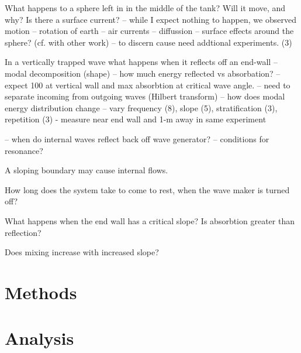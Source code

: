 \documentclass[11pt,letterpaper]{article}
\begin{document}
	 What happens to a sphere left in in the middle of the tank? 
	     Will it move, and  why? Is there a surface current?
	     -- while I expect nothing to happen,  we observed motion
	         -- rotation of earth
	         -- air currents
	         -- diffussion
	         -- surface effects around the sphere? (cf. with other work)
	   -- to discern cause need addtional experiments. (3)
	  
	In a vertically trapped wave what happens when it reflects off an end-wall
	  -- modal decomposition (shape)
	  -- how much energy reflected vs absorbation?
	     -- expect 100 at vertical wall and max absorbtion at critical wave angle.
	  -- need to separate incoming from outgoing waves (Hilbert transform)
	     -- how does modal energy distribution change
	    -- vary frequency (8), slope (5), stratification (3),  repetition (3)
	   - measure near end wall and 1-m away in same experiment
	   
	      -- when do internal waves reflect back off wave generator?
	           -- conditions for resonance?
	     
     A sloping boundary may cause internal flows. 
	 
	 How long does the system take to come to rest, when the wave maker is turned off?
	 
	 What happens when the end wall has a critical slope? Is absorbtion greater than reflection?
	 
	 Does mixing increase with increased slope?  
	

	
	\section{Methods}
	\section{Analysis}
	
\end{document}
